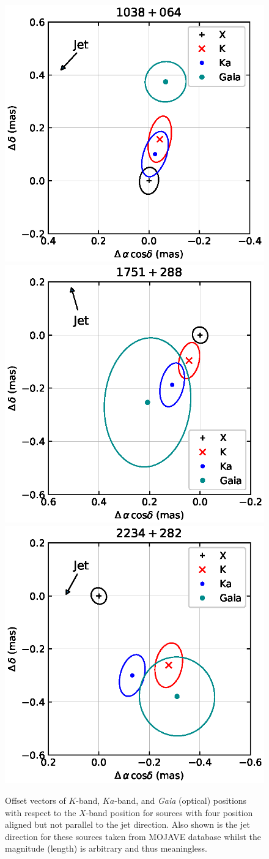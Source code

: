 \documentclass{aa}
\begin{document}
\begin{appendix}
\begin{figure}[hbtp]
        \includegraphics[width=0.3\columnwidth]{figs/1038+064}
        \includegraphics[width=0.3\columnwidth]{figs/1751+288}
        \includegraphics[width=0.3\columnwidth]{figs/2234+282}
        \caption[]{\label{fig:up}
            Offset vectors of $K$-band, $Ka$-band, and {\it Gaia} (optical) positions with respect to the $X$-band position for sources with four position aligned but not parallel to the jet direction.
            Also shown is the jet direction for these sources taken from MOJAVE database whilst the magnitude (length) is arbitrary and thus meaningless.
        }
    \end{figure}



\end{appendix}
\end{document}
